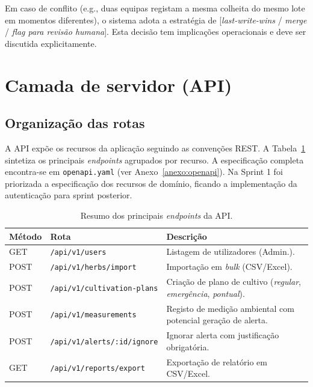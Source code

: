 \begin{aviso}
Em caso de conflito (e.g., duas equipas registam a mesma colheita
do mesmo lote em momentos diferentes), o sistema adota a estratégia
de [\emph{last-write-wins} / \emph{merge} / \emph{flag para revisão
humana}]. Esta decisão tem implicações operacionais e deve ser
discutida explicitamente.
\end{aviso}


\section{Camada de servidor (API)}
\label{sec:camada-api}


\subsection{Organização das rotas}

A API expõe os recursos da aplicação seguindo as convenções REST.
A Tabela~\ref{tab:rotas} sintetiza os principais \emph{endpoints}
agrupados por recurso. A especificação completa encontra-se em
\texttt{openapi.yaml} (ver Anexo~\ref{anexo:openapi}).
Na Sprint 1 foi priorizada a especificação dos recursos de domínio,
ficando a implementação da autenticação para sprint posterior.

\begin{table}[H]
\centering
\caption{Resumo dos principais \emph{endpoints} da API.}
\label{tab:rotas}
\footnotesize
\renewcommand{\arraystretch}{1.3}
\begin{tabularx}{\linewidth}{l l X}
\toprule
\textbf{Método} & \textbf{Rota} & \textbf{Descrição} \\
\midrule
GET   & \texttt{/api/v1/users}                  & Listagem de utilizadores (Admin.). \\
POST  & \texttt{/api/v1/herbs/import}           & Importação em \emph{bulk} (CSV/Excel). \\
POST  & \texttt{/api/v1/cultivation-plans}      & Criação de plano de cultivo (\emph{regular}, \emph{emergência}, \emph{pontual}). \\
POST  & \texttt{/api/v1/measurements}           & Registo de medição ambiental com potencial geração de alerta. \\
POST  & \texttt{/api/v1/alerts/:id/ignore}      & Ignorar alerta com justificação obrigatória. \\
GET   & \texttt{/api/v1/reports/export}         & Exportação de relatório em CSV/Excel. \\
\bottomrule
\end{tabularx}
\end{table}


